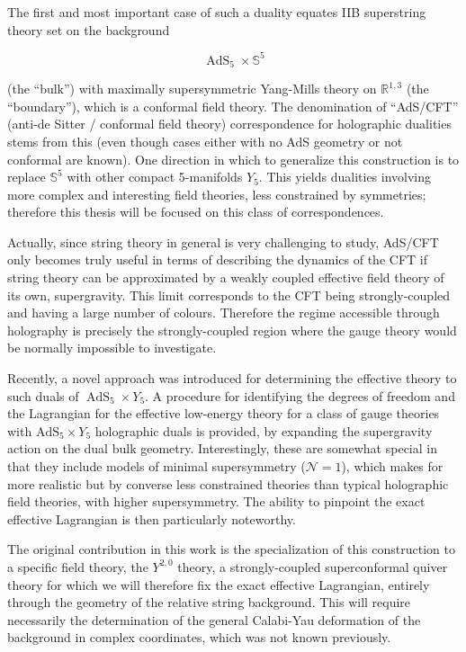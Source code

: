 The first and most important case of such a duality\cite{Maldacena} equates IIB superstring theory set on the background

\begin{equation}
	\operatorname{AdS}_5 \times \mathbb{S}^5
\end{equation}

(the ``bulk'') with maximally supersymmetric Yang-Mills theory on $\mathbb{R}^{1,3}$ (the ``boun\-da\-ry''), which is a conformal field theory. The denomination of ``AdS/CFT'' (anti-de Sitter / conformal field theory) correspondence for holographic dualities stems from this (even though cases either with no AdS geometry or not conformal are known). One direction in which to generalize this construction is to replace $\mathbb{S}^5$ with other compact 5-manifolds $Y_5$. This yields dualities involving more complex and interesting field theories, less constrained by symmetries; therefore this thesis will be focused on this class of correspondences.

Actually, since string theory in general is very challenging to study, AdS/CFT only becomes truly useful in terms of describing the dynamics of the CFT if string theory can be approximated by a weakly coupled effective field theory of its own, supergravity. This limit corresponds to the CFT being strongly-coupled and having a large number of colours. Therefore the regime accessible through holography is precisely the strongly-coupled region where the gauge theory would be normally impossible to investigate.

Recently, a novel approach was introduced\cite{MZ} for determining the effective theory to such duals of $\operatorname{AdS}_5 \times Y_5$. A procedure for identifying the degrees of freedom and the Lagrangian for the effective low-energy theory for a class of gauge theories with $\operatorname{AdS_5} \times Y_5$ holographic duals is provided, by expanding the supergravity action on the dual bulk geometry. Interestingly, these are somewhat special in that they include models of minimal supersymmetry ($\mathcal{N}=1$), which makes for more realistic but by converse less constrained theories than typical holographic field theories, with higher supersymmetry. The ability to pinpoint the exact effective Lagrangian is then particularly noteworthy.

The original contribution in this work is the specialization of this construction to a specific field theory, the $Y^{2,0}$ theory, a strongly-coupled superconformal quiver theory for which we will therefore fix the exact effective Lagrangian, entirely through the geometry of the relative string background. This will require necessarily the determination of the general Calabi-Yau deformation of the background in complex coordinates, which was not known previously.

